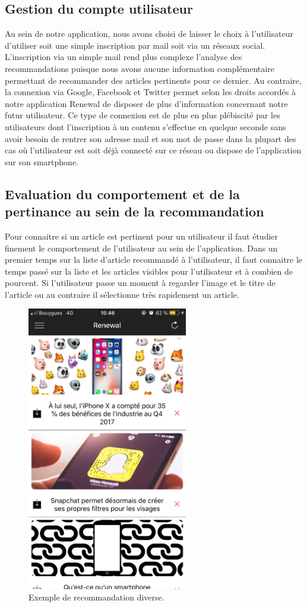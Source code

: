 \subsection{Gestion du compte utilisateur}

Au sein de notre application, nous avons choisi de laisser le choix à l'utilisateur d'utiliser soit une simple inscription par mail soit via un réseaux social. L'inscription via un simple mail rend plus complexe l'analyse des recommandations puisque nous avons aucune information complémentaire permettant de recommander des articles pertinents pour ce dernier. Au contraire, la connexion via Google, Facebook et Twitter permet selon les droits accordés à notre application Renewal de disposer de plus d'information concernant notre futur utilisateur. Ce type de connexion est de plus en plus plébiscité par les utilisateurs dont l'inscription à un contenu s'effectue en quelque seconde sans avoir besoin de rentrer son adresse mail et son mot de passe dans la plupart des cas où l'utilisateur est soit déjà connecté sur ce réseau ou dispose de l'application sur son smartphone.

\subsection{Evaluation du comportement et de la pertinance au sein de la recommandation}

Pour connaitre si un article est pertinent pour un utilisateur il faut étudier finement le comportement de l'utilisateur au sein de l'application. Dans un premier temps sur la liste d'article recommandé à l'utilisateur, il faut connaitre le temps passé sur la liste et les articles visibles pour l'utilisateur et à combien de pourcent. Si l’utilisateur passe un moment à regarder l’image et le titre de l’article ou au contraire il sélectionne très rapidement un article.

\begin{figure}[htp]
  \centering
  \includegraphics[width=7cm]{images/divers}
  \caption{Exemple de recommandation diverse.}
  \label{fig:screen-settings}
\end{figure}


